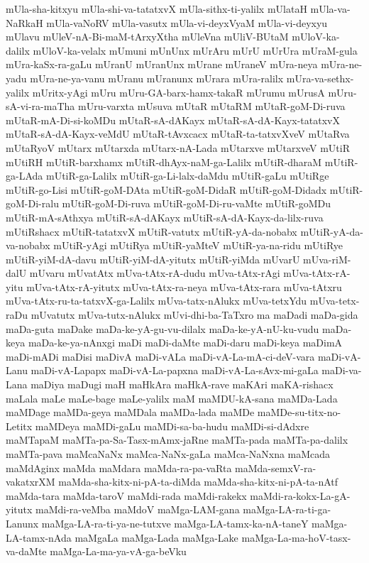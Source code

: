 {mUla-sha-kitxyu
mUla-shi-va-tatatxvX
mUla-sithx-ti-yalilx
mUlataH
mUla-va-NaRkaH
mUla-vaNoRV
mUla-vasutx
mUla-vi-deyxVyaM
mUla-vi-deyxyu
mUlavu
mUleV-nA-Bi-maM-tArxyXtha
mUleVna
mUliV-BUtaM
mUloV-ka-dalilx
mUloV-ka-velalx
mUmuni
mUnUnx
mUrAru
mUrU
mUrUra
mUraM-gula
mUra-kaSx-ra-gaLu
mUranU
mUranUnx
mUrane
mUraneV
mUra-neya
mUra-ne-yadu
mUra-ne-ya-vanu
mUranu
mUranunx
mUrara
mUra-ralilx
mUra-va-sethx-yalilx
mUritx-yAgi
mUru
mUru-GA-barx-hamx-takaR
mUrumu
mUrusA
mUru-sA-vi-ra-maTha
mUru-varxta
mUsuva
mUtaR
mUtaRM
mUtaR-goM-Di-ruva
mUtaR-mA-Di-si-koMDu
mUtaR-sA-dAKayx
mUtaR-sA-dA-Kayx-tatatxvX
mUtaR-sA-dA-Kayx-veMdU
mUtaR-tAvxcacx
mUtaR-ta-tatxvXveV
mUtaRva
mUtaRyoV
mUtarx
mUtarxda
mUtarx-nA-Lada
mUtarxve
mUtarxveV
mUtiR
mUtiRH
mUtiR-barxhamx
mUtiR-dhAyx-naM-ga-Lalilx
mUtiR-dharaM
mUtiR-ga-LAda
mUtiR-ga-Lalilx
mUtiR-ga-Li-lalx-daMdu
mUtiR-gaLu
mUtiRge
mUtiR-go-Lisi
mUtiR-goM-DAta
mUtiR-goM-DidaR
mUtiR-goM-Didadx
mUtiR-goM-Di-ralu
mUtiR-goM-Di-ruva
mUtiR-goM-Di-ru-vaMte
mUtiR-goMDu
mUtiR-mA-sAthxya
mUtiR-sA-dAKayx
mUtiR-sA-dA-Kayx-da-lilx-ruva
mUtiRshacx
mUtiR-tatatxvX
mUtiR-vatutx
mUtiR-yA-da-nobabx
mUtiR-yA-da-va-nobabx
mUtiR-yAgi
mUtiRya
mUtiR-yaMteV
mUtiR-ya-na-ridu
mUtiRye
mUtiR-yiM-dA-davu
mUtiR-yiM-dA-yitutx
mUtiR-yiMda
mUvarU
mUva-riM-dalU
mUvaru
mUvatAtx
mUva-tAtx-rA-dudu
mUva-tAtx-rAgi
mUva-tAtx-rA-yitu
mUva-tAtx-rA-yitutx
mUva-tAtx-ra-neya
mUva-tAtx-rara
mUva-tAtxru
mUva-tAtx-ru-ta-tatxvX-ga-Lalilx
mUva-tatx-nAlukx
mUva-tetxYdu
mUva-tetx-raDu
mUvatutx
mUva-tutx-nAlukx
mUvi-dhi-ba-TaTxro
ma
maDadi
maDa-gida
maDa-guta
maDake
maDa-ke-yA-gu-vu-dilalx
maDa-ke-yA-nU-ku-vudu
maDa-keya
maDa-ke-ya-nAnxgi
maDi
maDi-daMte
maDi-daru
maDi-keya
maDimA
maDi-mADi
maDisi
maDivA
maDi-vALa
maDi-vA-La-mA-ci-deV-vara
maDi-vA-Lanu
maDi-vA-Lapapx
maDi-vA-La-papxna
maDi-vA-La-sAvx-mi-gaLa
maDi-va-Lana
maDiya
maDugi
maH
maHkAra
maHkA-rave
maKAri
maKA-rishacx
maLala
maLe
maLe-bage
maLe-yalilx
maM
maMDU-kA-sana
maMDa-Lada
maMDage
maMDa-geya
maMDala
maMDa-lada
maMDe
maMDe-su-titx-no-Letitx
maMDeya
maMDi-gaLu
maMDi-sa-ba-hudu
maMDi-si-dAdxre
maMTapaM
maMTa-pa-Sa-Tasx-mAmx-jaRne
maMTa-pada
maMTa-pa-dalilx
maMTa-pava
maMcaNaNx
maMca-NaNx-gaLa
maMca-NaNxna
maMcada
maMdAginx
maMda
maMdara
maMda-ra-pa-vaRta
maMda-semxV-ra-vakatxrXM
maMda-sha-kitx-ni-pA-ta-diMda
maMda-sha-kitx-ni-pA-ta-nAtf
maMda-tara
maMda-taroV
maMdi-rada
maMdi-rakekx
maMdi-ra-kokx-La-gA-yitutx
maMdi-ra-veMba
maMdoV
maMga-LAM-gana
maMga-LA-ra-ti-ga-Lanunx
maMga-LA-ra-ti-ya-ne-tutxve
maMga-LA-tamx-ka-nA-taneY
maMga-LA-tamx-nAda
maMgaLa
maMga-Lada
maMga-Lake
maMga-La-ma-hoV-tasx-va-daMte
maMga-La-ma-ya-vA-ga-beVku
}
